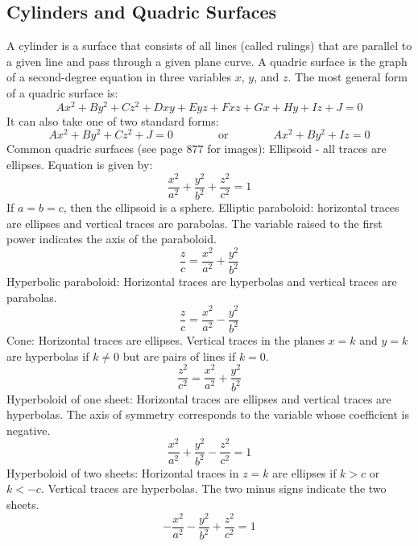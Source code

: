 \documentclass{article}
\begin{document}
    \subsection{Cylinders and Quadric Surfaces}
    \begin{outline}
        \1 A cylinder is a surface that consists of all lines (called rulings) that are parallel to a given line and pass through a given plane curve. 
        \1 A quadric surface is the graph of a second-degree equation in three variables \(x\), \(y\), and \(z\). The most general form of a quadric surface is: \[Ax^2+By^2+Cz^2+Dxy+Eyz+Fxz+Gx+Hy+Iz+J=0\]
        \1 It can also take one of two standard forms: \[Ax^2+By^2+Cz^2+J=0\qquad\qquad\text{or}\qquad\qquad Ax^2+By^2+Iz=0\]
    \0 Common quadric surfaces (see page 877 for images): 
        \1 Ellipsoid - all traces are ellipses. Equation is given by: \[\dfrac{x^2}{a^2}+\dfrac{y^2}{b^2}+\dfrac{z^2}{c^2}=1\] If \(a=b=c\), then the ellipsoid is a sphere. 
        \1 Elliptic paraboloid: horizontal traces are ellipses and vertical traces are parabolas. The variable raised to the first power indicates the axis of the paraboloid. \[\dfrac{z}{c}=\dfrac{x^2}{a^2}+\dfrac{y^2}{b^2}\]
        \1 Hyperbolic paraboloid: Horizontal traces are hyperbolas and vertical traces are parabolas. \[\dfrac{z}{c}=\dfrac{x^2}{a^2}-\dfrac{y^2}{b^2}\]
        \1 Cone: Horizontal traces are ellipses. Vertical traces in the planes \(x=k\) and \(y=k\) are hyperbolas if \(k\neq 0\) but are pairs of lines if \(k=0\). \[\dfrac{z^2}{c^2}=\dfrac{x^2}{a^2}+\dfrac{y^2}{b^2}\]
        \1 Hyperboloid of one sheet: Horizontal traces are ellipses and vertical traces are hyperbolas. The axis of symmetry corresponds to the variable whose coefficient is negative. \[\dfrac{x^2}{a^2}+\dfrac{y^2}{b^2}-\dfrac{z^2}{c^2}=1\]
        \1 Hyperboloid of two sheets: Horizontal traces in \(z=k\) are ellipses if \(k>c\) or \(k<-c\). Vertical traces are hyperbolas. The two minus signs indicate the two sheets. \[-\dfrac{x^2}{a^2}-\dfrac{y^2}{b^2}+\dfrac{z^2}{c^2}=1\]
        
    \end{outline}
\end{document}
